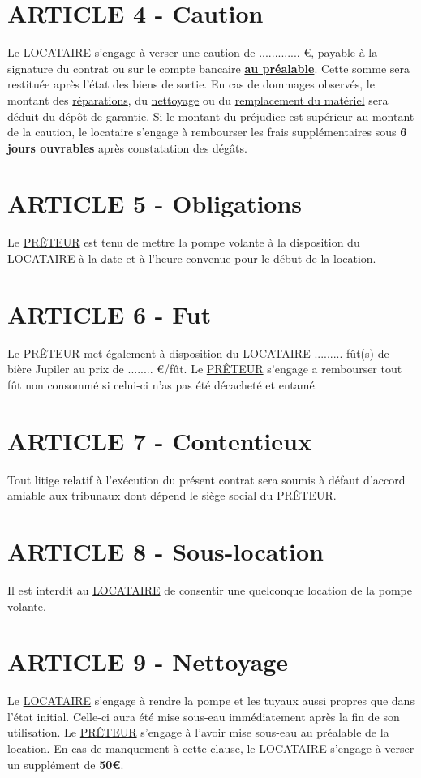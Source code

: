 \documentclass{article}
\begin{document}
\section*{ARTICLE 4 - Caution}
Le \underline{LOCATAIRE} s’engage à verser une caution de ............. €, payable à la signature du contrat ou sur le compte bancaire \textbf{\underline{au préalable}}. Cette somme sera restituée après l’état des biens de sortie. En cas de dommages observés, le montant des \underline{réparations}, du \underline{nettoyage} ou du \underline{remplacement du matériel} sera déduit du dépôt de garantie. Si le montant du préjudice est supérieur au montant de la caution, le locataire s’engage à rembourser les frais supplémentaires sous \textbf{6 jours ouvrables} après constatation des dégâts.

\section*{ARTICLE 5 - Obligations}
Le \underline{PRÊTEUR} est tenu de mettre la pompe volante à la disposition du \underline{LOCATAIRE} à la date et à l’heure convenue pour le début de la location.

\section*{ARTICLE 6 - Fut}
Le \underline{PRÊTEUR} met également à disposition du \underline{LOCATAIRE} ......... fût(s) de bière Jupiler au prix de ........ €/fût. Le \underline{PRÊTEUR} s'engage a rembourser tout fût non consommé si celui-ci n'as pas été décacheté et entamé.

\section*{ARTICLE 7 - Contentieux}
Tout litige relatif à l’exécution du présent contrat sera soumis à défaut d’accord amiable aux tribunaux dont dépend le siège social du \underline{PRÊTEUR}.

\section*{ARTICLE 8 - Sous-location}
Il est interdit au \underline{LOCATAIRE} de consentir une quelconque location de la pompe volante.

\section*{ARTICLE 9 - Nettoyage}
Le \underline{LOCATAIRE} s’engage à rendre la pompe et les tuyaux aussi propres que dans l’état initial. Celle-ci aura été mise sous-eau immédiatement après la fin de son utilisation. Le \underline{PRÊTEUR} s'engage à l'avoir mise sous-eau au préalable de la location.
En cas de manquement à cette clause, le \underline{LOCATAIRE} s’engage à verser un supplément de \textbf{50€}.
\end{document}
